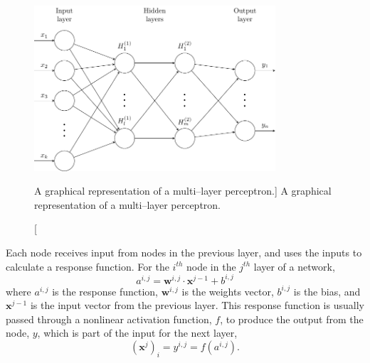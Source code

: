 \begin{figure}

	\centering

	\includegraphics[width = 0.8\textwidth]{figures/mlp.pdf}

	\caption
	[A graphical representation of a multi--layer perceptron.]
	{ A graphical representation of a multi--layer perceptron. }

	\label{fig:mlp}

\end{figure}

Each node receives input from nodes in the previous layer, and uses the inputs
to calculate a response function. For the $i^{th}$ node in the $j^{th}$ layer 
of a network, 
\begin{equation*}
	a^{i,j} = \mathbf{w}^{i,j} \cdot \mathbf{x}^{j-1} + b^{i,j}
\end{equation*}
where $a^{i,j}$ is the response function, $\mathbf{w}^{i,j}$ is the weights
vector, $b^{i,j}$ is the bias, and $\mathbf{x}^{j-1}$ is the input vector from 
the previous layer. This response function is usually passed through a
nonlinear activation function, $f$, to produce the output from the node,
$y$, which is part of the input for the next layer,
\begin{equation*}
	\left(\mathbf{x}^j\right)_i = y^{i,j} = f \left( a^{i,j} \right).
\end{equation*}

